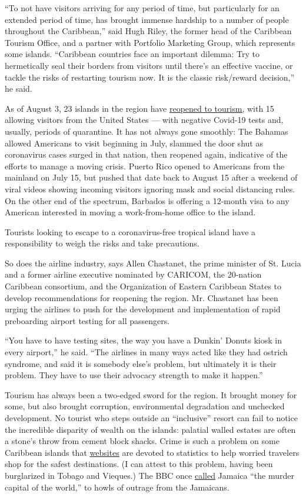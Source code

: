 ``To not have visitors arriving for any period of time, but particularly
for an extended period of time, has brought immense hardship to a number
of people throughout the Caribbean,'' said Hugh Riley, the former head
of the Caribbean Tourism Office, and a partner with Portfolio Marketing
Group, which represents some islands. ``Caribbean countries face an
important dilemma: Try to hermetically seal their borders from visitors
until there's an effective vaccine, or tackle the risks of restarting
tourism now. It is the classic risk/reward decision,'' he said.

As of August 3, 23 islands in the region have
\href{https://docs.google.com/document/d/1ytW37gjS3WeVhN-k4ZK-N5fwgrksljMIEsd6ToGSOB8/edit}{reopened
to tourism,} with 15 allowing visitors from the United States --- with
negative Covid-19 tests and, usually, periods of quarantine. It has not
always gone smoothly: The Bahamas allowed Americans to visit beginning
in July, slammed the door shut as coronavirus cases surged in that
nation, then reopened again, indicative of the efforts to manage a
moving crisis. Puerto Rico opened to Americans from the mainland on July
15, but pushed that date back to August 15 after a weekend of viral
videos showing incoming visitors ignoring mask and social distancing
rules. On the other end of the spectrum, Barbados is offering a 12-month
visa to any American interested in moving a work-from-home office to the
island.

Tourists looking to escape to a coronavirus-free tropical island have a
responsibility to weigh the risks and take precautions.

So does the airline industry, says Allen Chastanet, the prime minister
of St. Lucia and a former airline executive nominated by CARICOM, the
20-nation Caribbean consortium, and the Organization of Eastern
Caribbean States to develop recommendations for reopening the region.
Mr. Chastanet has been urging the airlines to push for the development
and implementation of rapid preboarding airport testing for all
passengers.

``You have to have testing sites, the way you have a Dunkin' Donuts
kiosk in every airport,'' he said. ``The airlines in many ways acted
like they had ostrich syndrome, and said it is somebody else's problem,
but ultimately it is their problem. They have to use their advocacy
strength to make it happen.''

Tourism has always been a two-edged sword for the region. It brought
money for some, but also brought corruption, environmental degradation
and unchecked development. No tourist who steps outside an ``inclusive''
resort can fail to notice the incredible disparity of wealth on the
islands: palatial walled estates are often a stone's throw from cement
block shacks. Crime is such a problem on some Caribbean islands that
\href{https://www.tripsavvy.com/safest-and-most-dangerous-caribbean-islands-4157732}{websites}
are devoted to statistics to help worried travelers shop for the safest
destinations. (I can attest to this problem, having been burglarized in
Tobago and Vieques.) The BBC once
\href{http://www.bbc.co.uk/caribbean/news/story/2006/01/060103_murderlist.shtml}{called}
Jamaica ``the murder capital of the world,'' to howls of outrage from
the Jamaicans.

